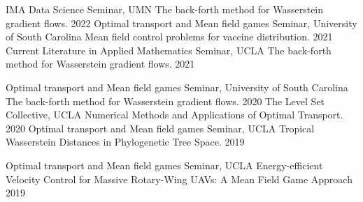 


\begin{cvtalks}

  \cvtalk
    {IMA Data Science Seminar, UMN} %
    {The back-forth method for Wasserstein gradient flows.} %
    {2022} %
  \cvtalk
    {Optimal transport and Mean field games Seminar, University of South Carolina} %
    {Mean field control problems for vaccine distribution.} %
    {2021} %
  \cvtalk
    {Current Literature in Applied Mathematics Seminar, UCLA} %
    {The back-forth method for Wasserstein gradient flows.} %
    {2021} %
\end{cvtalks}

\vspace{-4mm}

\begin{cvtalks}

  \cvtalk
    {Optimal transport and Mean field games Seminar, University of South Carolina} %
    {The back-forth method for Wasserstein gradient flows.} %
    {2020} %
  \cvtalk
    {The Level Set Collective, UCLA} %
    {Numerical Methods and Applications of Optimal Transport.} %
    {2020} %
  \cvtalk
    {Optimal transport and Mean field games Seminar, UCLA} %
    {Tropical Wasserstein Distances in Phylogenetic Tree Space.} %
    {2019} %
    
\end{cvtalks}

\vspace{-4mm}

\begin{cvtalks}

  \cvtalk
    {Optimal transport and Mean field games Seminar, UCLA} %
    {Energy-efficient Velocity Control for Massive Rotary-Wing UAVs: A Mean Field Game Approach} %
    {2019} %
\end{cvtalks}

